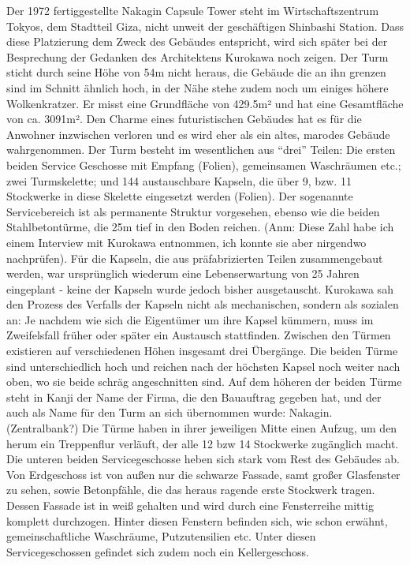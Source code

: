 \documentclass[a4paper, 12pt]{article}
\begin{document}
\begin{onehalfspace}
Der 1972 fertiggestellte Nakagin Capsule Tower steht im Wirtschaftszentrum Tokyos, dem Stadtteil Giza, nicht unweit der geschäftigen Shinbashi Station. Dass diese Platzierung dem Zweck des Gebäudes entspricht, wird sich später bei der Besprechung der Gedanken des Architektens Kurokawa noch zeigen. Der Turm sticht durch seine Höhe von 54m nicht heraus, die Gebäude die an ihn grenzen sind im Schnitt ähnlich hoch, in der Nähe stehe zudem noch um einiges höhere Wolkenkratzer. Er misst eine Grundfläche von 429.5m² und hat eine Gesamtfläche von ca. 3091m². Den Charme eines futuristischen Gebäudes hat es für die Anwohner inzwischen verloren und es wird eher als ein altes, marodes Gebäude wahrgenommen. 
Der Turm besteht im wesentlichen aus “drei” Teilen: Die ersten beiden Service Geschosse mit Empfang (Folien), gemeinsamen Waschräumen etc.; zwei Turmskelette; und 144 austauschbare Kapseln, die über 9, bzw. 11 Stockwerke in diese Skelette eingesetzt werden (Folien). Der sogenannte Servicebereich ist als permanente Struktur vorgesehen, ebenso wie die beiden Stahlbetontürme, die 25m tief in den Boden reichen. (Anm: Diese Zahl habe ich einem Interview mit Kurokawa entnommen, ich konnte sie aber nirgendwo nachprüfen). Für die Kapseln, die aus präfabrizierten Teilen zusammengebaut werden, war ursprünglich wiederum eine Lebenserwartung von 25 Jahren eingeplant - keine der Kapseln wurde jedoch bisher ausgetauscht. Kurokawa sah den Prozess des Verfalls der Kapseln nicht als mechanischen, sondern als sozialen an: Je nachdem wie sich die Eigentümer um ihre Kapsel kümmern, muss im Zweifelsfall früher oder später ein Austausch stattfinden. 
Zwischen den Türmen existieren auf verschiedenen Höhen insgesamt drei Übergänge. Die beiden Türme sind unterschiedlich hoch und reichen nach der höchsten Kapsel noch weiter nach oben, wo sie beide schräg angeschnitten sind. Auf dem höheren der beiden Türme steht in Kanji der Name der Firma, die den Bauauftrag gegeben hat, und der auch als Name für den Turm an sich übernommen wurde: Nakagin. (Zentralbank?) Die Türme haben in ihrer jeweiligen Mitte einen Aufzug, um den herum ein Treppenflur verläuft, der alle 12 bzw 14 Stockwerke zugänglich macht.
Die unteren beiden Servicegeschosse heben sich stark vom Rest des Gebäudes ab. Von Erdgeschoss ist von außen nur die schwarze Fassade, samt großer Glasfenster zu sehen, sowie Betonpfähle, die das heraus ragende erste Stockwerk tragen. Dessen Fassade ist in weiß gehalten und wird durch eine Fensterreihe mittig komplett durchzogen. Hinter diesen Fenstern befinden sich, wie schon erwähnt, gemeinschaftliche Waschräume, Putzutensilien etc. Unter diesen Servicegeschossen gefindet sich zudem noch ein Kellergeschoss. 

\end{onehalfspace}
\end{document}
